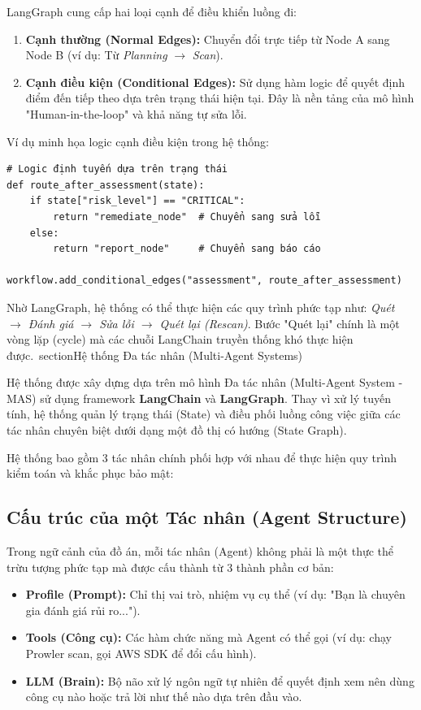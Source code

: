 LangGraph cung cấp hai loại cạnh để điều khiển luồng đi:

\begin{enumerate}
    \item \textbf{Cạnh thường (Normal Edges):} Chuyển đổi trực tiếp từ Node A sang Node B (ví dụ: Từ \textit{Planning} $\rightarrow$ \textit{Scan}).
    \item \textbf{Cạnh điều kiện (Conditional Edges):} Sử dụng hàm logic để quyết định điểm đến tiếp theo dựa trên trạng thái hiện tại. Đây là nền tảng của mô hình "Human-in-the-loop" và khả năng tự sửa lỗi.
\end{enumerate}



Ví dụ minh họa logic cạnh điều kiện trong hệ thống:
\begin{verbatim}
# Logic định tuyến dựa trên trạng thái
def route_after_assessment(state):
    if state["risk_level"] == "CRITICAL":
        return "remediate_node"  # Chuyển sang sửa lỗi
    else:
        return "report_node"     # Chuyển sang báo cáo

workflow.add_conditional_edges("assessment", route_after_assessment)
\end{verbatim}

Nhờ LangGraph, hệ thống có thể thực hiện các quy trình phức tạp như: \textit{Quét $\rightarrow$ Đánh giá $\rightarrow$ Sửa lỗi $\rightarrow$ Quét lại (Rescan)}. Bước "Quét lại" chính là một vòng lặp (cycle) mà các chuỗi LangChain truyền thống khó thực hiện được.\
section{Hệ thống Đa tác nhân (Multi-Agent Systems)}

Hệ thống được xây dựng dựa trên mô hình Đa tác nhân (Multi-Agent System - MAS) sử dụng framework \textbf{LangChain} và \textbf{LangGraph}. Thay vì xử lý tuyến tính, hệ thống quản lý trạng thái (State) và điều phối luồng công việc giữa các tác nhân chuyên biệt dưới dạng một đồ thị có hướng (State Graph).

Hệ thống bao gồm 3 tác nhân chính phối hợp với nhau để thực hiện quy trình kiểm toán và khắc phục bảo mật:

\subsection{Cấu trúc của một Tác nhân (Agent Structure)}

Trong ngữ cảnh của đồ án, mỗi tác nhân (Agent) không phải là một thực thể trừu tượng phức tạp mà được cấu thành từ 3 thành phần cơ bản:
\begin{itemize}
    \item \textbf{Profile (Prompt):} Chỉ thị vai trò, nhiệm vụ cụ thể (ví dụ: "Bạn là chuyên gia đánh giá rủi ro...").
    \item \textbf{Tools (Công cụ):} Các hàm chức năng mà Agent có thể gọi (ví dụ: chạy Prowler scan, gọi AWS SDK để đổi cấu hình).
    \item \textbf{LLM (Brain):} Bộ não xử lý ngôn ngữ tự nhiên để quyết định xem nên dùng công cụ nào hoặc trả lời như thế nào dựa trên đầu vào.
\end{itemize}



